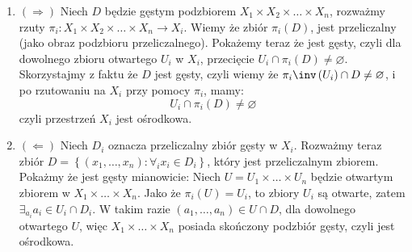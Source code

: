 \documentclass[11pt]{scrartcl}
\begin{document}
   \begin{enumerate}
     \item $(\Rightarrow)$ Niech $D$ będzie gęstym podzbiorem $X_1 \times X_2 \times \dots \times X_n$, rozważmy rzuty $\pi_i : X_1 \times X_2 \times \dots \times X_n \to X_i$.
       Wiemy że zbiór $\pi_i (D)$, jest przeliczalny (jako obraz podzbioru przeliczalnego). Pokażemy teraz że jest gęsty, czyli dla dowolnego zbioru otwartego $U_i$ w $X_i$, przecięcie $U_i \cap \pi_i (D)\not = \varnothing$.
       Skorzystajmy z faktu że $D$ jest gęsty, czyli wiemy że $\pi_i \inv \left ( U_i \right ) \cap D \not = \varnothing$, i po rzutowaniu na $X_i$ przy pomocy $\pi_i$, mamy:
       \[
           U_i \cap \pi_i (D) \not = \varnothing
       \]
       czyli przestrzeń $X_i$ jest ośrodkowa.
     \item $(\Leftarrow)$ Niech $D_i$ oznacza przeliczalny zbiór gęsty w $X_i$. Rozważmy teraz zbiór $D = \left \{ (x_1, \dots, x_n) : \forall_i x_i \in D_i \right \}$, który jest przeliczalnym zbiorem. Pokażmy że jest gęsty mianowicie:
       Niech $U = U_1 \times \dots \times U_n$ będzie otwartym zbiorem w $X_1 \times \dots \times X_n$. Jako że $\pi_i (U) = U_i$, to zbiory $U_i$ są otwarte, zatem $\exists_{a_i} a_i \in U_i \cap D_i$. W takim razie $(a_1, \dots , a_n) \in U \cap D$, dla dowolnego otwartego $U$, więc $X_1 \times \dots \times X_n$ posiada skończony podzbiór gęsty, czyli jest ośrodkowa.
   \end{enumerate}
   
   
   
\end{document}
